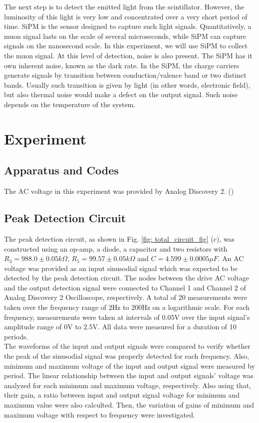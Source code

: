 \documentclass[%
 reprint,
 amsmath,amssymb,
 aps,
floatfix,
]{revtex4-2}
\begin{document}
The next step is to detect the emitted light from the scintillator. 
However, the luminosity of this light is very low and concentrated over a very short period of time. 
SiPM is the sensor designed to capture such light signals.
Quantitatively, a muon signal lasts on the scale of several microseconds, while SiPM can capture signals on the nanosecond scale.
In this experiment, we will use SiPM to collect the muon signal.
At this level of detection, noise is also present.
The SiPM has it own inherent noise, known as the dark rate.
In the SiPM, the charge carriers generate signals by transition between conduction/valence band or two distinct bands.
Usually such transition is given by light (in other words, electronic field), but also thermal noise would make a defect on the output signal.
Such noise depends on the temperature of the system.


\section{Experiment}
\subsection{Apparatus and Codes}
The AC voltage in this experiment was provided by Analog Discovery 2. (\cite{K_AnalogDiscovery2})

\subsection{Peak Detection Circuit}
The peak detection circuit, as shown in Fig. \ref{fig: total_circuit_fig} (c), was constructed using an op-amp, a diode, a capacitor and two resistors with $R_3=988.0\pm0.05k\Omega$, $R_5=99.57\pm0.05k\Omega$ and $C=4.599\pm0.0005\mu F$.
An AC voltage was provided as an input sinusodial signal which was expected to be detected by the peak detection circuit.  
The nodes between the drive AC voltage and the output detection signal were connected to Channel 1 and Channel 2 of Analog Discovery 2 Oscilloscope, respectively. 
A total of 20 measurements were taken over the frequency range of $2\mathrm{Hz}$ to $200\mathrm{Hz}$ on a logarithmic scale.  
For each frequency, measurements were taken at intervals of $0.05\mathrm{V}$ over the input signal's amplitude range of $0\mathrm{V}$ to $2.5\mathrm{V}$. 
All data were measured for a duration of 10 periods. \\
The waveforms of the input and output signals were compared to verify whether the peak of the sinusodial signal was properly detected for each frequency. 
Also, minimum and maximum voltage of the input and output signal were measured by period. 
The linear relationship between the input and output signals' voltage was analyzed for each minimum and maximum voltage, respectively. 
Also using that, their gain, a ratio between input and output signal voltage for minimum and maximum value were also calculted. 
Then, the variation of gains of minimum and maximum voltage with respect to frequency were investigated.
\\
\end{document}
